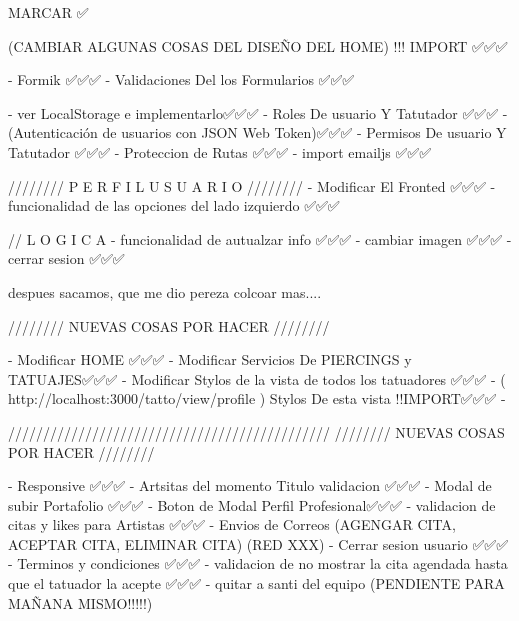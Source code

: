 
MARCAR ✅

(CAMBIAR ALGUNAS COSAS DEL DISEÑO DEL HOME) !!! IMPORT  ✅✅✅

    - Formik ✅✅✅
    - Validaciones Del los Formularios ✅✅✅

    - ver LocalStorage e implementarlo✅✅✅
    - Roles De usuario Y Tatutador ✅✅✅
    - (Autenticación de usuarios con JSON Web Token)✅✅✅
    - Permisos De usuario Y Tatutador ✅✅✅
    - Proteccion de Rutas ✅✅✅
    - import emailjs ✅✅✅



////////   P E R F I L   U S U A R I O   ////////  
    - Modificar El Fronted ✅✅✅
    - funcionalidad de las opciones del lado izquierdo ✅✅✅

    // L O G I C A
    - funcionalidad de autualzar info ✅✅✅
    - cambiar imagen ✅✅✅
    - cerrar sesion ✅✅✅

despues sacamos, que me dio pereza colcoar mas....

////////   NUEVAS COSAS POR HACER    ////////  

    - Modificar HOME ✅✅✅
    - Modificar Servicios De PIERCINGS y TATUAJES✅✅✅
    - Modificar Stylos de la vista de todos los tatuadores ✅✅✅
    - ( http://localhost:3000/tatto/view/profile )  Stylos De esta vista !!IMPORT✅✅✅
    -


//////////////////////////////////////////////
////////   NUEVAS COSAS POR HACER    //////// 

    - Responsive ✅✅✅
    - Artsitas del momento Titulo validacion ✅✅✅
    - Modal de subir Portafolio ✅✅✅
    - Boton de Modal Perfil Profesional✅✅✅
    - validacion de citas y likes para Artistas ✅✅✅
    - Envios de Correos (AGENGAR CITA,  ACEPTAR CITA, ELIMINAR CITA) (RED XXX)
    - Cerrar sesion usuario ✅✅✅
    - Terminos y condiciones ✅✅✅
    - validacion de no mostrar la cita agendada hasta que el tatuador la acepte ✅✅✅
    - quitar a santi del equipo (PENDIENTE PARA MAÑANA MISMO!!!!!)





